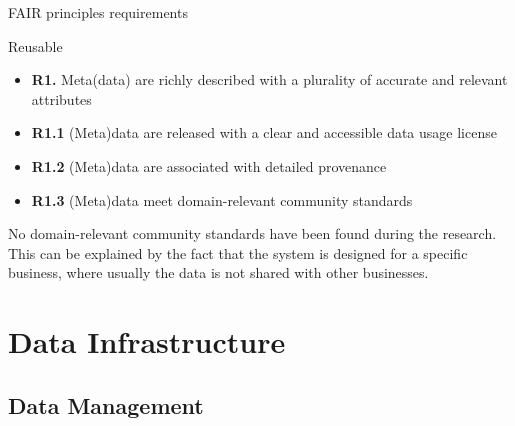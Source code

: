 \begin{frame}[allowframebreaks]{FAIR\autocite{Wilkinson_2016} principles requirements}
	\framebreak

	\begin{block}{Reusable}
		\begin{itemize}
			\item \textbf{R1.} Meta(data) are richly described with a plurality of accurate and relevant attributes
			\item \textbf{R1.1} (Meta)data are released with a clear and accessible data usage license
			\item \textcolor{UNITSCherry}{\textbf{R1.2} (Meta)data are associated with detailed provenance}
			\item \textcolor{UNITSCherry}{\textbf{R1.3} (Meta)data meet domain-relevant community standards}
		\end{itemize}
	\end{block}
	No domain-relevant community standards have been found during the research. This can be explained by
	the fact that the system is designed for a specific business, where usually the data is not shared with other
	businesses.
\end{frame}


\section{Data Infrastructure}

\subsection{Data Management}

